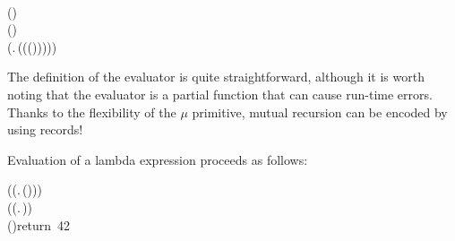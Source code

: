 \begin{hscode}
\\
\>[9]{}\<[11]%
\>[11]{}\;(\mathbin{:})\Rightarrow {}\;\<[E]%
\\
\>[9]{}\mid {}\;(\mathbin{:}\to {})\Rightarrow {}\<[E]%
\\
\>[9]{}\<[13]%
\>[13]{}\;(\lambda {}\mathbin{:}.\,(\;\;(\;(\;\;))))){}\<[E]%
\\
\>[3]{}\;\;\mathbin{:}\to {}\mathrel{=}\;\;\<[E]%
\ColumnHook
\end{hscode}\resethooks

The definition of the evaluator is quite straightforward, although it
is worth noting that the evaluator is a partial function that can
cause run-time errors. Thanks to the flexibility of the $\mu$
primitive, mutual recursion can be encoded by using records!

Evaluation of a lambda expression proceeds as follows:
\begin{hscode}\SaveRestoreHook
{}%
%
%
%
\>[3]{}\;\mathbin{:}\mathrel{=}\;{}\<[25]%
\>[25]{}(\;(\lambda {}\mathbin{:}.\,\;\;(\;)))\;{}\<[E]%
\\
\>[25]{}(\;(\lambda {}\mathbin{:}.\,)){}\<[E]%
\\
\>[3]{}\;\;(\;)\mbox{\onelinecomment  return 42}{}\<[E]%
\ColumnHook
\end{hscode}\resethooks
